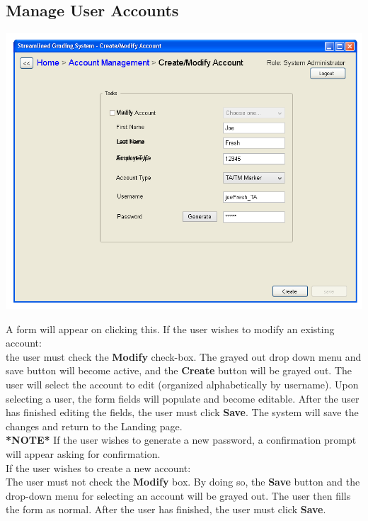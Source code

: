\documentclass{article}
\begin{document}
\subsection{Manage User Accounts}
\centerline{\includegraphics[scale=0.55]{../images/UIMockups/pngs/accountModification}}
\label{manageAccts}
A form will appear on clicking this. 
If the user wishes to modify an existing account: \\
the user must check the \textbf{Modify} check-box. The grayed out drop down menu and
save button will become active, and the \textbf{Create} button will be grayed out.
The user will select the account to edit (organized alphabetically by username).
Upon selecting a user, the form fields will populate and become editable. After
the user has finished editing the fields, the user must click \textbf{Save}. The system
will save the changes and return to the Landing page. \\
\textbf{*NOTE*} If the user wishes to generate a new password, a confirmation
prompt will appear asking for confirmation.\\
If the user wishes to create a new account: \\
The user must not check the \textbf{Modify} box. By doing so, the \textbf{Save}
button and the drop-down menu for selecting an account will be grayed out.
The user then fills the form as normal. After the user has finished, the user
must click \textbf{Save}.
\end{document}
